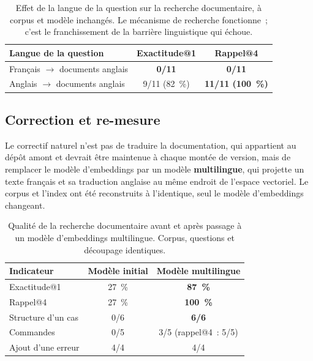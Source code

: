 \documentclass[12pt,a4paper,french]{report}
\begin{document}
\begin{table}[htbp]
\centering
\caption[Effet de la langue sur la recherche]{Effet de la langue de la question sur la recherche documentaire, à
corpus et modèle inchangés. Le mécanisme de recherche fonctionne~; c'est le
franchissement de la barrière linguistique qui échoue.}
\label{tab:rag-langue}
\begin{tabularx}{0.92\textwidth}{@{}Xcc@{}}
\toprule
\textbf{Langue de la question} & \textbf{Exactitude@1} & \textbf{Rappel@4}\\
\midrule
Français $\rightarrow$ documents anglais & \textcolor{cAlert}{\textbf{0/11}} &
  \textcolor{cAlert}{\textbf{0/11}}\\
Anglais $\rightarrow$ documents anglais & 9/11 (\SI{82}{\percent}) &
  \textbf{11/11 (\SI{100}{\percent})}\\
\bottomrule
\end{tabularx}
\end{table}

\subsection{Correction et re-mesure}

Le correctif naturel n'est pas de traduire la documentation, qui appartient au
dépôt amont et devrait être maintenue à chaque montée de version, mais de
remplacer le modèle d'embeddings par un modèle \textbf{multilingue}, qui projette
un texte français et sa traduction anglaise au même endroit de l'espace
vectoriel. Le corpus et l'index ont été reconstruits à l'identique, seul le
modèle d'embeddings changeant.

\begin{table}[htbp]
\centering
\caption[Qualité de la recherche documentaire]{Qualité de la recherche documentaire avant et après passage à un
modèle d'embeddings multilingue. Corpus, questions et découpage identiques.}
\label{tab:rag}
\begin{tabularx}{0.92\textwidth}{@{}Xcc@{}}
\toprule
\textbf{Indicateur} & \textbf{Modèle initial} & \textbf{Modèle multilingue}\\
\midrule
Exactitude@1 & \SI{27}{\percent} & \textbf{\SI{87}{\percent}}\\
Rappel@4 & \SI{27}{\percent} & \textbf{\SI{100}{\percent}}\\
\midrule
Structure d'un cas & 0/6 & \textbf{6/6}\\
Commandes & 0/5 & 3/5 (rappel@4~: 5/5)\\
Ajout d'une erreur & 4/4 & 4/4\\
\bottomrule
\end{tabularx}
\end{table}
\end{document}
